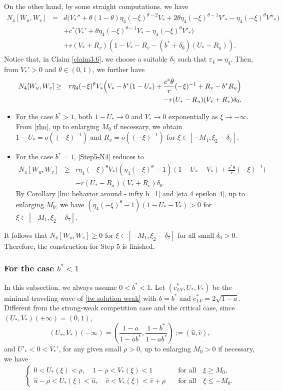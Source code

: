 \documentclass[11pt,a4paper]{article}
\numberwithin{equation}{section}
\numberwithin{figure}{section}
\newcommand\bea{\begin{eqnarray}}
\newcommand\eea{\end{eqnarray}}
\newcommand\beaa{\begin{eqnarray*}}
\newcommand\eeaa{\end{eqnarray*}}
\begin{document}
On the other hand, by some straight computations, we have
\beaa
N_4[W_u,W_v]&=&d\Big(V_*''+\theta(1-\theta)\eta_4(-\xi)^{\theta-2}V_*+2\theta\eta_4(-\xi)^{\theta-1}V'_*-\eta_4(-\xi)^{\theta}V''_*\Big)\\
&&+c^*\Big(V_*'+\theta\eta_4(-\xi)^{\theta-1}V_*-\eta_4(-\xi)^{\theta}V'_*\Big)\\&&
+r(V_*+R_v)(1-V_*-R_v-(b^*+\delta_0)(U_*-R_u)).
\eeaa
Notice that, in Claim \ref{claim3.6}, we choose a suitable $\delta_7$ such that $\varepsilon_4=\eta_4$.
Then, from $V_*'>0$ and $\theta\in(0,1)$, we further have
\bea\label{Step5-N4}
N_4[W_u,W_v]&\geq& r\eta_4(-\xi)^{\theta}V_*\Big(V_*-b^*(1-U_*)
+\frac{c^*\theta}{r}(-\xi)^{-1}+R_v-b^*R_u\Big)\notag\\
& &-r(U_*-R_u)(V_*+R_v)\delta_0.
\eea
\begin{itemize}
\item For the case $b^*>1$,  both $1-U_*\to 0$ and $V_*\to 0$ exponentially as $\xi\to-\infty$. From \eqref{rho},
up to
enlarging $M_0$ if necessary, we obtain $1-U_*=o((-\xi)^{-1})$ and $R_v=o((-\xi)^{-1})$ for $\xi\in[-M_1,\xi_2-\delta_7]$.
\item For the case $b^*=1$, \eqref{Step5-N4} reduces to
\beaa
N_4[W_u,W_v]&\geq& r\eta_4(-\xi)^{\theta}V_*\Big((\eta_4(-\xi)^{\theta}-1)(1-U_*-V_*)
+\frac{c^*\theta}{r}(-\xi)^{-1}\Big)\\
&&-r(U_*-R_u)(V_*+R_v)\delta_0.
\eeaa
By Corollary \ref{lm: behavior around - infty b=1} and \eqref{eta 4 epsilon 4}, %
up to enlarging $M_0$, we have
$(\eta_4(-\xi)^{\theta}-1)(1-U_*-V_*)>0$ for $\xi\in[-M_1,\xi_2-\delta_7]$.
\end{itemize}
It follows that
$N_4[W_u,W_v]\ge 0$ for $\xi\in[-M_1,\xi_2-\delta_7]$
for all small $\delta_0>0$.
Therefore,
the construction for Step 5 is finished.




\subsubsection{For the case $b^*<1$}\label{sec:3-2}

\noindent

In this subsection, we always assume $0<b^*<1$.
Let $(c_{LV}^*,U_*,V_*)$ be the minimal traveling wave of \eqref{tw solution weak} with $b=b^*$ and $c_{LV}^*=2\sqrt{1-a}$.
Different from the strong-weak competition case and the critical case, since $(U_*,V_*)(+\infty)=(0,1)$,
$$(U_*,V_*)(-\infty)=(\frac{1-a}{1-ab^*},\frac{1-b^*}{1-ab^*}):=(\hat u,\hat v),$$
and $U'_*<0<V_*'$, for any given small $\rho>0$, up to enlarging $M_0>0$ if necessary, we have
\bea\label{rho 2}
\begin{cases}
0< U_*(\xi)<\rho,\quad 1-\rho<V_*(\xi)<1&\quad\mbox{for all}\quad\xi\geq M_0,\\
\hat u-\rho< U_*(\xi)<\hat u,\quad \hat v<V_*(\xi)<\hat v+\rho&\quad\mbox{for all}\quad\xi\leq -M_0.
\end{cases}
\eea
\end{document}
